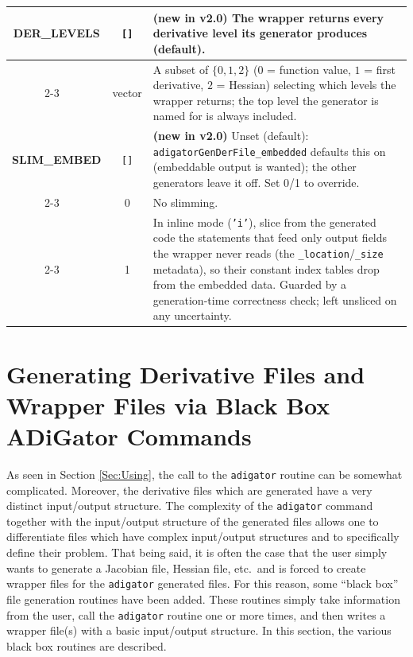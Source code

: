 \documentclass[10pt,pdftex]{article}
\begin{document}
\begin{longtable}{|c|c|p{9.9cm}|}
{\bf DER\_LEVELS} & \texttt{[]} & {\bf (new in v2.0)} The wrapper returns every derivative level its generator produces (default). \\ \cline{2-3}
~ & vector & A subset of $\{0,1,2\}$ ($0$ = function value, $1$ = first derivative, $2$ = Hessian) selecting which levels the wrapper returns; the top level the generator is named for is always included. \\ \hline
{\bf SLIM\_EMBED} & \texttt{[]} & {\bf (new in v2.0)} Unset (default): \texttt{adigatorGenDerFile\_embedded} defaults this on (embeddable output is wanted); the other generators leave it off. Set 0/1 to override. \\ \cline{2-3}
~ & 0 & No slimming. \\ \cline{2-3}
~ & 1 & In inline mode (\texttt{'i'}), slice from the generated code the statements that feed only output fields the wrapper never reads (the \texttt{\_location}/\texttt{\_size} metadata), so their constant index tables drop from the embedded data. Guarded by a generation-time correctness check; left unsliced on any uncertainty. \\ \hline
\end{longtable}

\section{Generating Derivative Files and Wrapper Files via Black Box ADiGator Commands}
As seen in Section \ref{Sec:Using}, the call to the \texttt{adigator} routine can be somewhat complicated. Moreover, the derivative files which are generated have a very distinct input/output structure. The complexity of the \texttt{adigator} command together with the input/output structure of the generated files allows one to differentiate files which have complex input/output structures and to specifically define their problem.
That being said, it is often the case that the user simply wants to generate a Jacobian file, Hessian file, etc.~and is forced to create wrapper files for the \texttt{adigator} generated files.
For this reason, some ``black box'' file generation routines have been added. These routines simply take information from the user, call the \texttt{adigator} routine one or more times, and then writes a wrapper file(s) with a basic input/output structure. In this section, the various black box routines are described.
\end{document}

